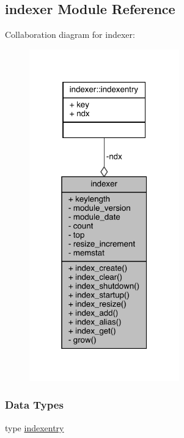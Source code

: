 \hypertarget{classindexer}{\subsection{indexer Module Reference}
\label{classindexer}
}


Collaboration diagram for indexer\-:
\nopagebreak
\begin{figure}[H]
\begin{center}
\leavevmode
\includegraphics[width=184pt]{classindexer__coll__graph}
\end{center}
\end{figure}
\subsubsection*{Data Types}
\begin{DoxyCompactItemize}
\item 
type \hyperlink{structindexer_1_1indexentry}{indexentry}
\end{DoxyCompactItemize}
